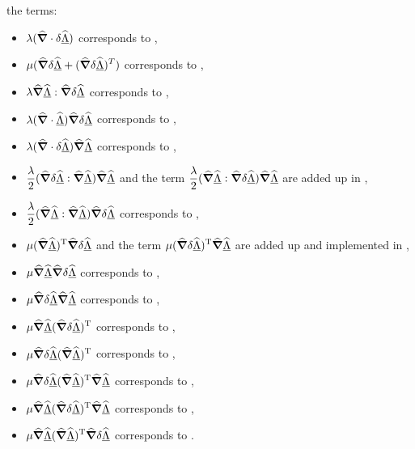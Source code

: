 the terms:
\begin{itemize}
  \item $\displaystyle \lambda(\delOp\cdot\delta\Spost)$ corresponds
to ,
  \item $\displaystyle \mu(\delOp\delta\Spost +
(\delOp\delta\Spost)^T)$ corresponds to ,
  \item $\displaystyle \lambda\delOp\Spost:\delOp\delta\Spost$
corresponds to ,
  \item $\displaystyle \lambda(\delOp\cdot\Spost)\delOp\delta\Spost$
corresponds to ,
  \item $\displaystyle \lambda(\delOp\cdot\delta\Spost)\delOp\Spost$
corresponds to ,
  \item $\displaystyle
\frac{\lambda}{2}(\delOp\delta\Spost:\delOp\Spost)\delOp\Spost$ and
the term $\displaystyle
\frac{\lambda}{2}(\delOp\Spost:\delOp\delta\Spost)\delOp\Spost$ are
added up in ,
  \item $\displaystyle
\frac{\lambda}{2}(\delOp\Spost:\delOp\Spost)\delOp\delta\Spost$
corresponds to ,
  \item $\displaystyle \mu(\delOp\Spost)^{\text{T}}\delOp\delta\Spost$
and the term $\displaystyle
\mu(\delOp\delta\Spost)^{\text{T}}\delOp\Spost$ are added up and
implemented in ,
  \item $\displaystyle \mu\delOp\Spost\delOp\delta\Spost$ corresponds
to ,
  \item $\displaystyle \mu\delOp\delta\Spost\delOp\Spost$ corresponds
to ,
  \item $\displaystyle \mu\delOp\Spost(\delOp\delta\Spost)^{\text{T}}$
corresponds to ,
  \item $\displaystyle \mu\delOp\delta\Spost(\delOp\Spost)^{\text{T}}$
corresponds to ,
  \item $\displaystyle
\mu\delOp\delta\Spost(\delOp\Spost)^{\text{T}}\delOp\Spost$
corresponds to ,
  \item $\displaystyle
\mu\delOp\Spost(\delOp\delta\Spost)^{\text{T}}\delOp\Spost$
corresponds to ,
  \item $\displaystyle
\mu\delOp\Spost(\delOp\Spost)^{\text{T}}\delOp\delta\Spost$
corresponds to .
\end{itemize}


